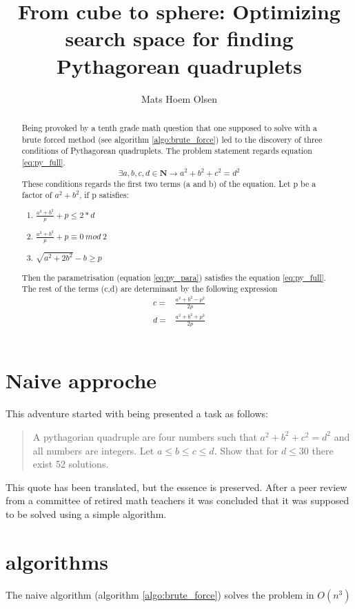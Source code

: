 \documentclass{article}
\title{From cube to sphere: Optimizing search space for finding Pythagorean quadruplets}
\author{Mats Hoem Olsen}
\begin{document}
\maketitle
\begin{abstract}
	Being provoked by a tenth grade math question that one supposed to solve with a brute forced method (see algorithm \ref{algo:brute_force}) led to the discovery of three conditions of Pythagorean quadruplets. The problem statement regards equation \ref{eq:py_full}.
	\begin{equation}\label{eq:py_full}
		\exists a,b,c,d \in \mathbf{N}\rightarrow a^2+b^2+c^2=d^2
	\end{equation}
	These conditions regards the first two terms (a and b) of the equation. Let p be a factor of $a^2+b^2$, if p satisfies:
	\begin{enumerate}
		\item $\frac{a^2+b^2}{p} + p \le 2*d$
		\item $\frac{a^2+b^2}{p} + p \equiv 0\ mod\ 2$
		\item $\sqrt{a^2+2b^2}-b \ge p$
	\end{enumerate}
	Then the parametrisation (equation \ref{eq:py_para}) satisfies the equation \ref{eq:py_full}. The rest of the terms (c,d) are determinant by the following expression
	$$
		\begin{matrix}
		c= & \frac{a^2+b^2-p^2}{2p}\\
		d= & \frac{a^2+b^2+p^2}{2p}
		\end{matrix}
	$$
\end{abstract}
\tableofcontents

\section{Naive approche}

This adventure started with being presented a task as follows:
\begin{quote}
	A pythagorian quadruple are four numbers such that $a^2+b^2+c^2=d^2$ and all numbers are integers. Let $a\le b \le c \le d$. Show that for $d \le 30$ there exist 52 solutions.
\end{quote}
This quote has been translated, but the essence is preserved. After a peer review from a committee of retired math teachers it was concluded that it was supposed to be solved using a simple algorithm.

\section{algorithms}
The naive algorithm (algorithm \ref{algo:brute_force}) solves the problem in $O(n^3)$ 
\end{document}
